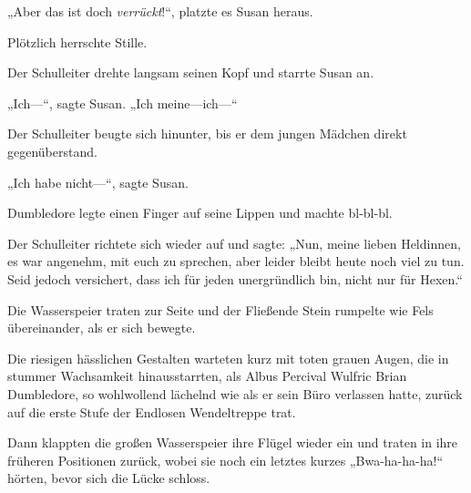 „Aber das ist doch \emph{verrückt}!“, platzte es Susan heraus.

Plötzlich herrschte Stille.

Der Schulleiter drehte langsam seinen Kopf und starrte Susan an.

„Ich—“, sagte Susan.
„Ich meine—ich—“

Der Schulleiter beugte sich hinunter, bis er dem jungen Mädchen direkt gegenüberstand.

„Ich habe nicht—“, sagte Susan.

Dumbledore legte einen Finger auf seine Lippen und machte bl-bl-bl.

Der Schulleiter richtete sich wieder auf und sagte:
„Nun, meine lieben Heldinnen, es war angenehm, mit euch zu sprechen, aber leider bleibt heute noch viel zu tun. Seid jedoch versichert, dass ich für jeden unergründlich bin, nicht nur für Hexen.“

Die Wasserspeier traten zur Seite und der Fließende Stein rumpelte wie Fels übereinander, als er sich bewegte.

Die riesigen hässlichen Gestalten warteten kurz mit toten grauen Augen, die in stummer Wachsamkeit hinausstarrten, als Albus Percival Wulfric Brian Dumbledore, so wohlwollend lächelnd wie als er sein Büro verlassen hatte, zurück auf die erste Stufe der Endlosen Wendeltreppe trat.

Dann klappten die großen Wasserspeier ihre Flügel wieder ein und traten in ihre früheren Positionen zurück, wobei sie noch ein letztes kurzes
„Bwa-ha-ha-ha!“ hörten, bevor sich die Lücke schloss.


